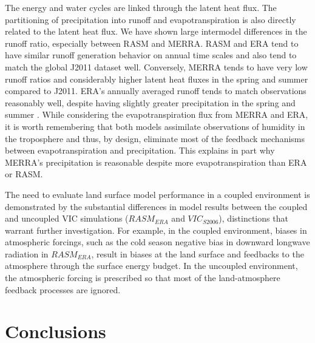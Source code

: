 The energy and water cycles are linked through the latent heat flux.
The partitioning of precipitation into runoff and evapotranspiration is also directly related to the latent heat flux.
We have shown large intermodel differences in the runoff ratio, especially between RASM and MERRA.
RASM and ERA tend to have similar runoff generation behavior on annual time scales and also tend to match the global J2011 dataset well.
Conversely, MERRA tends to have very low runoff ratios and considerably higher latent heat fluxes in the spring and summer compared to J2011.
ERA’s annually averaged runoff tends to match observations reasonably well, despite having slightly greater precipitation in the spring and summer \citep[see Fig. \ref{fig:streamflow_scatter} herein; ][]{Lindsay_2014}.
While considering the evapotranspiration flux from MERRA and ERA, it is worth remembering that both models assimilate observations of humidity in the troposphere and thus, by design, eliminate most of the feedback mechanisms between evapotranspiration and precipitation.
This explains in part why MERRA’s precipitation is reasonable despite more evapotranspiration than ERA or RASM.

The need to evaluate land surface model performance in a coupled environment is demonstrated by the substantial differences in model results between the coupled and uncoupled VIC simulations ($RASM_{ERA}$ and $VIC_{S2006}$), distinctions that warrant further investigation.
For example, in the coupled environment, biases in atmospheric forcings, such as the cold season negative bias in downward longwave radiation in $RASM_{ERA}$, result in biases at the land surface and feedbacks to the atmosphere through the surface energy budget.
In the uncoupled environment, the atmospheric forcing is prescribed so that most of the land-atmosphere feedback processes are ignored.

\section{Conclusions}
\label{sec:conclusions_ch3}

